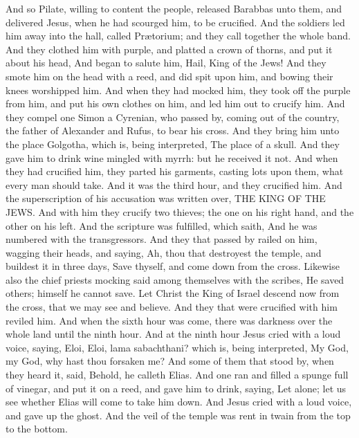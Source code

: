  And so Pilate, willing to content the people, released
Barabbas unto them, and delivered Jesus, when he had scourged him, to be
crucified.  And the soldiers led him away into the hall,
called Prætorium; and they call together the whole band. 
And they clothed him with purple, and platted a crown of thorns, and put
it about his head,  And began to salute him, Hail, King
of the Jews!  And they smote him on the head with a reed,
and did spit upon him, and bowing their knees worshipped him.
 And when they had mocked him, they took off the purple
from him, and put his own clothes on him, and led him out to crucify
him.  And they compel one Simon a Cyrenian, who passed
by, coming out of the country, the father of Alexander and Rufus, to
bear his cross.  And they bring him unto the place
Golgotha, which is, being interpreted, The place of a skull.
 And they gave him to drink wine mingled with myrrh: but
he received it not.  And when they had crucified him,
they parted his garments, casting lots upon them, what every man should
take.  And it was the third hour, and they crucified him.
 And the superscription of his accusation was written
over, THE KING OF THE JEWS.  And with him they crucify
two thieves; the one on his right hand, and the other on his left.
 And the scripture was fulfilled, which saith, And he was
numbered with the transgressors.  And they that passed by
railed on him, wagging their heads, and saying, Ah, thou that destroyest
the temple, and buildest it in three days,  Save thyself,
and come down from the cross.  Likewise also the chief
priests mocking said among themselves with the scribes, He saved others;
himself he cannot save.  Let Christ the King of Israel
descend now from the cross, that we may see and believe. And they that
were crucified with him reviled him.  And when the sixth
hour was come, there was darkness over the whole land until the ninth
hour.  And at the ninth hour Jesus cried with a loud
voice, saying, Eloi, Eloi, lama sabachthani? which is, being
interpreted, My God, my God, why hast thou forsaken me? 
And some of them that stood by, when they heard it, said, Behold, he
calleth Elias.  And one ran and filled a spunge full of
vinegar, and put it on a reed, and gave him to drink, saying, Let alone;
let us see whether Elias will come to take him down.  And
Jesus cried with a loud voice, and gave up the ghost. 
And the veil of the temple was rent in twain from the top to the bottom.

